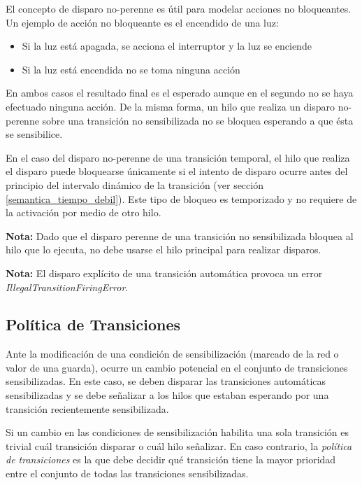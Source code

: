 El concepto de disparo no-perenne es útil para modelar acciones no bloqueantes.
Un ejemplo de acción no bloqueante es el encendido de una luz:
\begin{itemize}
    \item Si la luz está apagada, se acciona el interruptor y la luz se enciende
    \item Si la luz está encendida no se toma ninguna acción
\end{itemize}
En ambos casos el resultado final es el esperado aunque en el segundo no se haya
efectuado ninguna acción.
De la misma forma, un hilo que realiza un disparo no-perenne sobre una
transición no sensibilizada no se bloquea esperando a que ésta se sensibilice.

En el caso del disparo no-perenne de una transición temporal, el hilo
que realiza el disparo puede bloquearse únicamente si el intento de disparo
ocurre antes del principio del intervalo dinámico de la transición (ver sección
\ref{semantica_tiempo_debil}). Este tipo de bloqueo es temporizado y no requiere
de la activación por medio de otro hilo.

\begin{framed}
\textbf{Nota:} Dado que el disparo perenne de una transición no sensibilizada
bloquea al hilo que lo ejecuta, no debe usarse el hilo principal para realizar
disparos.
\end{framed}

\begin{framed}
\textbf{Nota:} El disparo explícito de una transición automática provoca un
error \textit{IllegalTransitionFiringError}.
\end{framed}

\subsection{Política de Transiciones}
\label{sec:politica_transiciones}
Ante la modificación de una condición de sensibilización (marcado de la red o
valor de una guarda), ocurre un cambio potencial en el conjunto de transiciones
sensibilizadas.
En este caso, se deben disparar las transiciones automáticas sensibilizadas y
se debe señalizar a los hilos que estaban esperando por una transición
recientemente sensibilizada.

Si un cambio en las condiciones de sensibilización habilita una sola
transición es trivial cuál transición disparar o cuál hilo señalizar. En caso
contrario, la \textit{política de transiciones} es la que debe decidir qué
transición tiene la mayor prioridad entre el conjunto de todas las transiciones
sensibilizadas.

